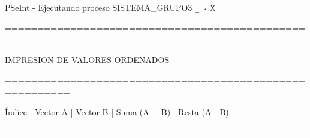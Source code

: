 \documentclass[12pt,a4paper]{article}
\newcommand{\consola}[1]{\noindent\textcolor{pseString}{#1}}
\newenvironment{PSeIntWindow}{%
	\begin{tcolorbox}[
		breakable,
		enhanced,
		colback=white,
		colframe=black!60,
		boxrule=0.5pt,
		arc=1mm,
		left=0mm,
		right=0mm,
		top=0mm,
		bottom=2mm,
		width=\textwidth
		]
	}{%
	\end{tcolorbox}
}
\newcommand{\BarraPSeInt}{%
	\colorbox{gray!20}{%
		\parbox{\dimexpr\textwidth-2\fboxsep\relax}{%
			\small
			\textcolor{pseString}{\faPlayCircle}
			\hspace{0.3em}
			PSeInt - Ejecutando proceso SISTEMA\_GRUPO3
			\hfill
			\texttt{\_ \hspace{0.5em} \(\square\) \hspace{0.5em} X}
		}
	}
}
\begin{document}
\begin{PSeIntWindow}
	
	\BarraPSeInt
	
	\vspace{0.2cm}
	
	\ttfamily\small
	
	\consola{========================================================}\par
	
	\begin{center}
		\textcolor{pseString}{IMPRESION DE VALORES ORDENADOS}
	\end{center}
	
	\consola{========================================================}\par
	
	\vspace{0.25cm}
	
	\consola{Índice \hspace{0.4cm}| \hspace{0.4cm} Vector A \hspace{0.4cm}| \hspace{0.4cm} Vector B \hspace{0.4cm}| \hspace{0.4cm} Suma (A + B) \hspace{0.4cm}| \hspace{0.4cm} Resta (A - B)}\par
	\consola{----------------------------------------------------------------}\par
	

\end{PSeIntWindow}
\end{document}
